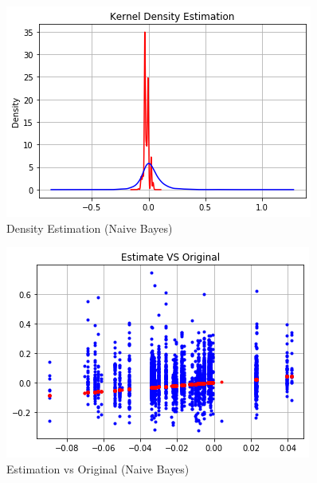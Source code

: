 \begin{figure}[h!]
	\centering
	\includegraphics[width=0.8\linewidth]{Figure/nb_density_estimation.png}
	\caption{Density Estimation (Naive Bayes)} 
	\label{fig:nb1}
\end{figure}

\begin{figure}[h!]
	\centering
	\includegraphics[width=0.8\linewidth]{Figure/nb_estimate_vs_original.png}
	\caption{Estimation vs Original (Naive Bayes)} 
	\label{fig:nb1}
\end{figure}\\

\newpage
